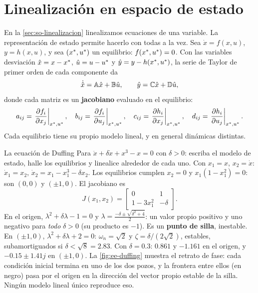 \section{Linealización en espacio de estado}
\label{sec:ee-linealizacion}

En la \cref{sec:so-linealizacion} linealizamos ecuaciones de una variable. La representación de estado permite hacerlo con todas a la vez. Sea $\dot x=f(x,u)$, $y=h(x,u)$, y sea $(x^{*},u^{*})$ un equilibrio: $f(x^{*},u^{*})=0$. Con las variables desviación $\hat{x}=x-x^{*}$, $\hat{u}=u-u^{*}$ y $\hat{y}=y-h(x^{*},u^{*})$, la serie de Taylor de primer orden de cada componente da
\begin{equation}
  \dot{\hat{x}}=\mathbb{A}\hat{x}+\mathbb{B}\hat{u},\qquad \hat{y}=\mathbb{C}\hat{x}+\mathbb{D}\hat{u},
  \label{eq:ee-lineal-desv}
\end{equation}
donde cada matriz es un \textbf{jacobiano} evaluado en el equilibrio:
\begin{equation}
  a_{ij}=\left.\frac{\partial f_i}{\partial x_j}\right|_{x^{*},u^{*}},\quad
  b_{ij}=\left.\frac{\partial f_i}{\partial u_j}\right|_{x^{*},u^{*}},\quad
  c_{ij}=\left.\frac{\partial h_i}{\partial x_j}\right|_{x^{*},u^{*}},\quad
  d_{ij}=\left.\frac{\partial h_i}{\partial u_j}\right|_{x^{*},u^{*}}.
  \label{eq:ee-jacobianos}
\end{equation}
Cada equilibrio tiene su propio modelo lineal, y en general dinámicas distintas.

\begin{ejemplo}[label=ej:ee-duffing]{La ecuación de Duffing}
Para $\ddot x+\delta\dot x+x^3-x=0$ con $\delta>0$: escriba el modelo de estado, halle los equilibrios y linealice alrededor de cada uno.
\solucion Con $x_1=x$, $x_2=\dot x$: $\dot x_1=x_2$, $\dot x_2=x_1-x_1^3-\delta x_2$. Los equilibrios cumplen $x_2=0$ y $x_1(1-x_1^2)=0$: son $(0,0)$ y $(\pm1,0)$. El jacobiano es
\[
  J(x_1,x_2)=\begin{bmatrix}0&1\\1-3x_1^2&-\delta\end{bmatrix} .
\]
En el origen, $\lambda^2+\delta\lambda-1=0$ y $\lambda=\frac{-\delta\pm\sqrt{\delta^2+4}}{2}$: un valor propio positivo y uno negativo para \emph{todo} $\delta>0$ (su producto es $-1$). Es un \textbf{punto de silla}, inestable. En $(\pm1,0)$, $\lambda^2+\delta\lambda+2=0$: $\omega_n=\sqrt2$ y $\zeta=\delta/(2\sqrt2)$, estables, subamortiguados si $\delta<\sqrt8=2.83$. Con $\delta=0.3$: $0.861$ y $-1.161$ en el origen, y $-0.15\pm1.41j$ en $(\pm1,0)$. La \cref{fig:ee-duffing} muestra el retrato de fase: cada condición inicial termina en uno de los dos pozos, y la frontera entre ellos (en negro) pasa por el origen en la dirección del vector propio estable de la silla. Ningún modelo lineal único reproduce eso.
\end{ejemplo}

